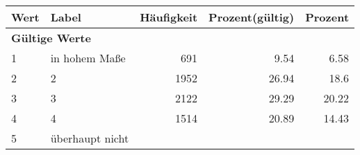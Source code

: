      \begin{longtable}{lXrrr}
     \toprule
     \textbf{Wert} & \textbf{Label} & \textbf{Häufigkeit} & \textbf{Prozent(gültig)} & \textbf{Prozent} \\
     \endhead
     \midrule
     \multicolumn{5}{l}{\textbf{Gültige Werte}}\\

     1 &
     \multicolumn{1}{X}{ in hohem Maße   } &


       \num{691} &
       \num[round-mode=places,round-precision=2]{9,54} &
         \num[round-mode=places,round-precision=2]{6,58} \\

     2 &
     \multicolumn{1}{X}{ 2   } &


       \num{1952} &
       \num[round-mode=places,round-precision=2]{26,94} &
         \num[round-mode=places,round-precision=2]{18,6} \\

     3 &
     \multicolumn{1}{X}{ 3   } &


       \num{2122} &
       \num[round-mode=places,round-precision=2]{29,29} &
         \num[round-mode=places,round-precision=2]{20,22} \\

     4 &
     \multicolumn{1}{X}{ 4   } &


       \num{1514} &
       \num[round-mode=places,round-precision=2]{20,89} &
         \num[round-mode=places,round-precision=2]{14,43} \\

     5 &
     \multicolumn{1}{X}{ überhaupt nicht   } &



\end{longtable}
